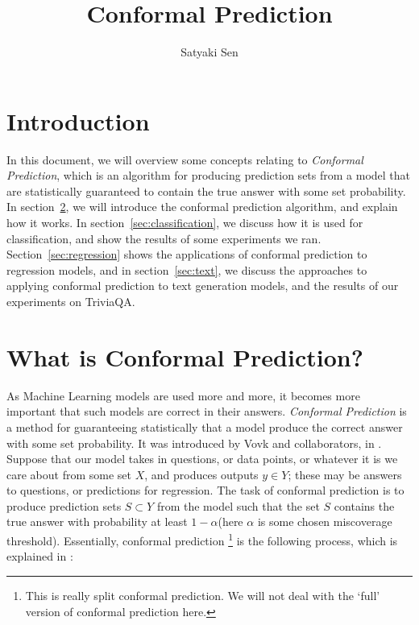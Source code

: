 \documentclass{scrartcl}
\title{Conformal Prediction}
\author{Satyaki Sen}
\begin{document}
\maketitle

\section{Introduction}
In this document, we will overview some concepts relating to \emph{Conformal Prediction}, 
which is an algorithm for producing prediction sets from a model that are statistically 
guaranteed to contain the true answer with some set probability. In section~\ref{sec:intro}, 
we will introduce the conformal prediction algorithm, and explain how it works. In section~\ref{sec:classification},
we discuss how it is used for classification, and show the results of some experiments we ran. Section~\ref{sec:regression}
shows the applications of conformal prediction to regression models, and in section~\ref{sec:text}, we discuss the approaches
to applying conformal prediction to text generation models, and the results of our experiments on TriviaQA.

\section{What is Conformal Prediction?}
\label{sec:intro}
As Machine Learning models are used more and more, it becomes more important
 that such models are correct in their answers. \emph{Conformal Prediction}
is a method for guaranteeing statistically that a model produce the correct answer with some set probability.
It was introduced by Vovk and collaborators, in \cite{vovkbook}.
Suppose that our model takes in questions, or data points, or whatever it is we care about from some set $X$, 
and produces outputs $y \in Y$; these may be answers to questions, or predictions for regression. The task of 
conformal prediction is to produce prediction sets $S \subset Y$ from the model such that the set $S$ contains 
the true answer with probability at least $1 - \alpha$(here $\alpha$ is some chosen miscoverage threshold). 
Essentially, conformal prediction \footnote{This is really split conformal prediction. We will not deal with the `full' version of conformal prediction here.} 
is the following process, which is explained in \cite{introcp}:
\end{document}
